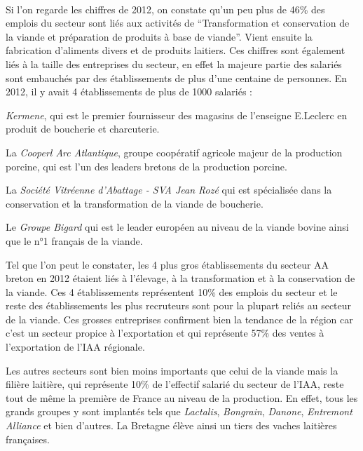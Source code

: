 \documentclass[a4paper,12pt]{report}
\begin{document}
			\paragraph{}Si l’on regarde les chiffres de 2012, on constate qu’un peu plus de 46\% des emplois du secteur sont liés aux activités de  “Transformation et conservation de la viande et préparation de produits à base de viande”. Vient ensuite la fabrication d’aliments divers et de produits laitiers. Ces chiffres sont également liés à la taille des entreprises du secteur, en effet la majeure partie des salariés sont embauchés par des établissements de plus d’une centaine de personnes. En 2012, il y avait 4 établissements de plus de 1000 salariés :
			\begin{list}{•}{}
			\item \textit{Kermene}, qui est le premier fournisseur des magasins de l’enseigne E.Leclerc en produit de boucherie et charcuterie.
			\item La \textit{Cooperl Arc Atlantique}, groupe coopératif agricole majeur de la production porcine, qui est l’un des leaders bretons de la production porcine.
			\item La \textit{Société Vitréenne d’Abattage - SVA Jean Rozé} qui est spécialisée dans la conservation et la transformation de la viande de boucherie.
			\item Le \textit{Groupe Bigard} qui est le leader européen au niveau de la viande bovine ainsi que le n°1 français de la viande\cite{BigardPremierTransformateurViande}.
			\end{list}
			
			Tel que l’on peut le constater, les 4 plus gros établissements du secteur AA breton en 2012 étaient liés à l’élevage, à la transformation et à la conservation de la viande. Ces 4 établissements représentent 10\% des emplois du secteur et le reste des établissements les plus recruteurs sont pour la plupart reliés au secteur de la viande. Ces grosses entreprises confirment bien la tendance de la région car c’est un secteur propice à l’exportation et qui représente 57\% des ventes à l’exportation de l’IAA régionale.
			
			Les autres secteurs sont bien moins importants que celui de la viande mais la filière laitière, qui représente 10\% de l’effectif salarié du secteur de l’IAA, reste tout de même la première de France au niveau de la production. En effet, tous les grands groupes y sont implantés tels que \textit{Lactalis}, \textit{Bongrain}, \textit{Danone}, \textit{Entremont Alliance} et bien d’autres\cite{ProduitsLaitiersRegionBretagne}. La Bretagne élève ainsi un tiers des vaches laitières françaises.
			
\end{document}
